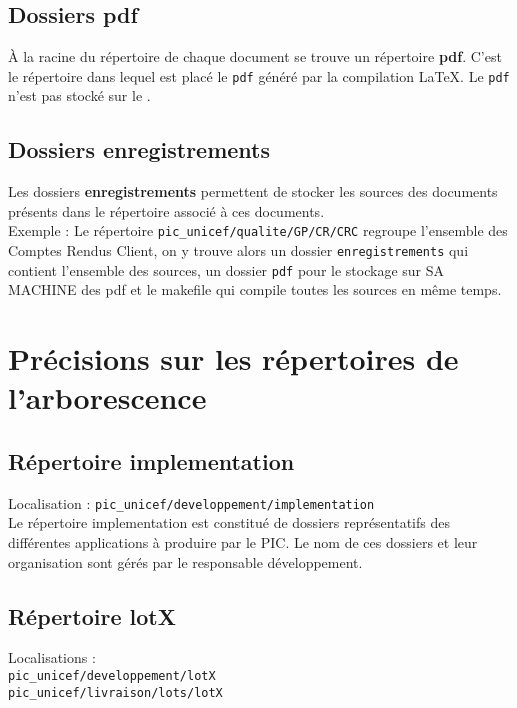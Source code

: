 \subsection{Dossiers pdf}

\`{A} la racine du répertoire de chaque document se trouve un répertoire \textbf{pdf}. C'est
le répertoire dans lequel est placé le \verb+pdf+ généré par la compilation \LaTeX{}. Le \verb+pdf+ n'est pas stocké sur le \git{}.

\subsection{Dossiers enregistrements}

Les dossiers \textbf{enregistrements} permettent de stocker les sources des documents présents dans le répertoire associé à ces documents.\\
Exemple : Le répertoire \verb+pic_unicef/qualite/GP/CR/CRC+ regroupe l'ensemble des Comptes Rendus Client, on y trouve alors un dossier \verb+enregistrements+ qui contient l'ensemble des sources, un dossier \verb+pdf+ pour le stockage sur SA MACHINE des pdf et le makefile qui compile toutes les sources en même temps.


\section{Précisions sur les répertoires de l'arborescence}

\subsection{Répertoire implementation}

Localisation : \verb+pic_unicef/developpement/implementation+\\

Le répertoire implementation est constitué de dossiers représentatifs des différentes applications à produire par le PIC. Le nom de ces dossiers et leur organisation sont gérés par le responsable développement.

\subsection{Répertoire lotX}

Localisations : \\
\verb+pic_unicef/developpement/lotX+\\
\verb+pic_unicef/livraison/lots/lotX+\\

